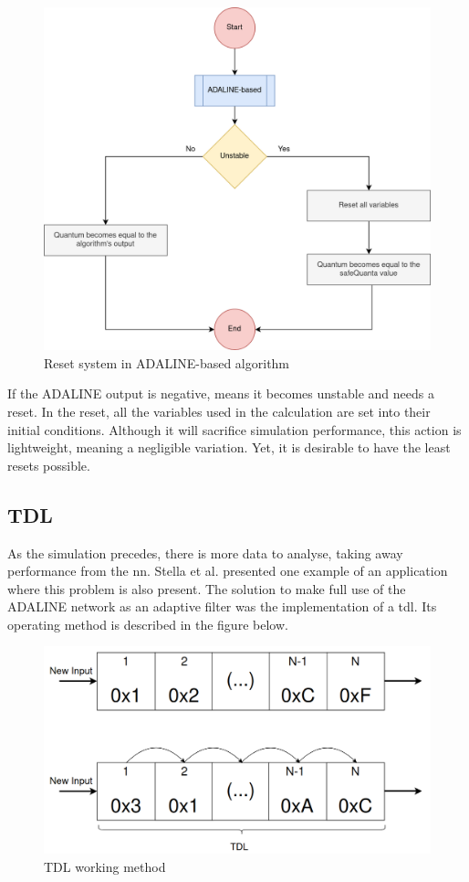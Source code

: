 \begin{figure}[H]
	\centering
 	\includegraphics[width=0.6\linewidth]{Images/ResetSystemADALINE.png}
 	\caption{Reset system in ADALINE-based algorithm}
	 \label{fig_ResetSystemADALINE}
\end{figure}

If the ADALINE output is negative, means it becomes unstable and needs a reset. In the reset, all the variables used in the calculation are set 
into their initial conditions. Although it will sacrifice simulation performance, this action is lightweight, meaning a negligible variation. 
Yet, it is desirable to have the least resets possible.

\subsection{TDL}

As the simulation precedes, there is more data to analyse, taking away performance from the \gls{nn}. Stella et al. \cite{noiseCancelingADALINE} 
presented one example of an application where this problem is also present. The solution to make full use of the ADALINE network as an adaptive 
filter was the implementation of a \gls{tdl}. Its operating method is described in the figure below. 

\begin{figure}[H]
	\centering
 	\includegraphics[width=0.5\linewidth]{Images/TDL.png}
 	\caption{TDL working method}
	 \label{fig_TDL}
\end{figure}

